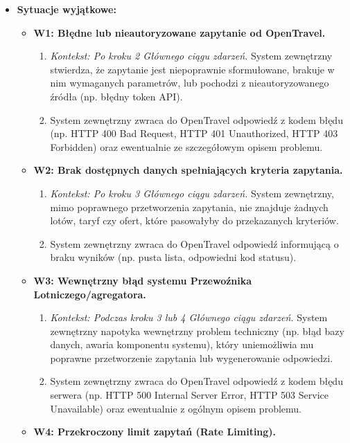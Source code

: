 \documentclass[a4paper,12pt]{article}
\begin{document}
\begin{itemize}
    \item \textbf{Sytuacje wyjątkowe:}
        \begin{itemize}
            \item \textbf{W1: Błędne lub nieautoryzowane zapytanie od OpenTravel.}
                \begin{enumerate}
                    \item \textit{Kontekst: Po kroku 2 Głównego ciągu zdarzeń.} System zewnętrzny stwierdza, że zapytanie jest niepoprawnie sformułowane, brakuje w nim wymaganych parametrów, lub pochodzi z nieautoryzowanego źródła (np. błędny token API).
                    \item System zewnętrzny zwraca do OpenTravel odpowiedź z kodem błędu (np. HTTP 400 Bad Request, HTTP 401 Unauthorized, HTTP 403 Forbidden) oraz ewentualnie ze szczegółowym opisem problemu.
                \end{enumerate}
            \item \textbf{W2: Brak dostępnych danych spełniających kryteria zapytania.}
                \begin{enumerate}
                    \item \textit{Kontekst: Po kroku 3 Głównego ciągu zdarzeń.} System zewnętrzny, mimo poprawnego przetworzenia zapytania, nie znajduje żadnych lotów, taryf czy ofert, które pasowałyby do przekazanych kryteriów.
                    \item System zewnętrzny zwraca do OpenTravel odpowiedź informującą o braku wyników (np. pusta lista, odpowiedni kod statusu).
                \end{enumerate}
            \item \textbf{W3: Wewnętrzny błąd systemu Przewoźnika Lotniczego/agregatora.}
                \begin{enumerate}
                    \item \textit{Kontekst: Podczas kroku 3 lub 4 Głównego ciągu zdarzeń.} System zewnętrzny napotyka wewnętrzny problem techniczny (np. błąd bazy danych, awaria komponentu systemu), który uniemożliwia mu poprawne przetworzenie zapytania lub wygenerowanie odpowiedzi.
                    \item System zewnętrzny zwraca do OpenTravel odpowiedź z kodem błędu serwera (np. HTTP 500 Internal Server Error, HTTP 503 Service Unavailable) oraz ewentualnie z ogólnym opisem problemu.
                \end{enumerate}
            \item \textbf{W4: Przekroczony limit zapytań (Rate Limiting).}

\end{itemize}
\end{itemize}
\end{document}
